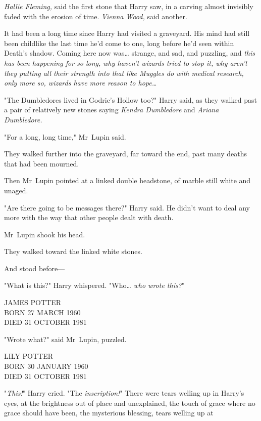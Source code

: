 \emph{Hallie Fleming,} said the first stone that Harry saw, in a carving almost
invisibly faded with the erosion of time. \emph{Vienna Wood,} said another.

It had been a long time since Harry had visited a graveyard. His mind had still
been childlike the last time he'd come to one, long before he'd seen within
Death's shadow. Coming here now was{\ldots} strange, and sad, and puzzling, and
\emph{this has been happening for so long, why haven't wizards tried to stop
it, why aren't they putting all their strength into that like Muggles do with
medical research, only more so, wizards have more reason to hope{\ldots}}

"The Dumbledores lived in Godric's Hollow too?" Harry said, as they walked past
a pair of relatively new stones saying \emph{Kendra Dumbledore} and
\emph{Ariana Dumbledore.}

"For a long, long time," Mr~Lupin said.

They walked further into the graveyard, far toward the end, past many deaths
that had been mourned.

Then Mr~Lupin pointed at a linked double headstone, of marble still white and
unaged.

"Are there going to be messages there?" Harry said. He didn't want to deal any
more with the way that other people dealt with death.

Mr~Lupin shook his head.

They walked toward the linked white stones.

And stood before---

"What is this?" Harry whispered. "Who{\ldots} \emph{who wrote this?}"

\begin{center}
JAMES POTTER\\
BORN 27 MARCH 1960\\
DIED 31 OCTOBER 1981
\end{center}

"Wrote what?" said Mr~Lupin, puzzled.

\begin{center}
LILY POTTER\\
BORN 30 JANUARY 1960\\
DIED 31 OCTOBER 1981
\end{center}

"\emph{This!}" Harry cried. "The \emph{inscription!}" There were tears welling
up in Harry's eyes, at the brightness out of place and unexplained, the touch
of grace where no grace should have been, the mysterious blessing, tears
welling up at


